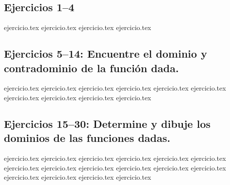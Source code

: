 
\subsection*{Ejercicios 1--4}
\begin{enumerate}
    {ejercicio.tex}
    {ejercicio.tex}
    {ejercicio.tex}
    {ejercicio.tex}
\end{enumerate}

\subsection*{Ejercicios 5--14: Encuentre el dominio y contradominio de la función dada.}
\begin{enumerate}
    \setcounter{enumi}{4}
    {ejercicio.tex}
    {ejercicio.tex}
    {ejercicio.tex}
    {ejercicio.tex}
    {ejercicio.tex}
    {ejercicio.tex}
    {ejercicio.tex}
    {ejercicio.tex}
    {ejercicio.tex}
    {ejercicio.tex}
\end{enumerate}

\subsection*{Ejercicios 15--30: Determine y dibuje los dominios de las funciones dadas.}
\begin{enumerate}
    \setcounter{enumi}{14}
    {ejercicio.tex}
    {ejercicio.tex}
    {ejercicio.tex}
    {ejercicio.tex}
    {ejercicio.tex}
    {ejercicio.tex}
    {ejercicio.tex}
    {ejercicio.tex}
    {ejercicio.tex}
    {ejercicio.tex}
    {ejercicio.tex}
    {ejercicio.tex}
    {ejercicio.tex}
    {ejercicio.tex}
    {ejercicio.tex}
    {ejercicio.tex}
\end{enumerate}

